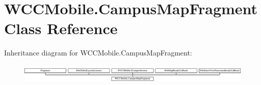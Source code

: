 \hypertarget{class_w_c_c_mobile_1_1_campus_map_fragment}{}\section{W\+C\+C\+Mobile.\+Campus\+Map\+Fragment Class Reference}
\label{class_w_c_c_mobile_1_1_campus_map_fragment}
Inheritance diagram for W\+C\+C\+Mobile.\+Campus\+Map\+Fragment\+:\begin{figure}[H]
\begin{center}
\leavevmode
\includegraphics[height=0.921811cm]{class_w_c_c_mobile_1_1_campus_map_fragment}
\end{center}
\end{figure}
